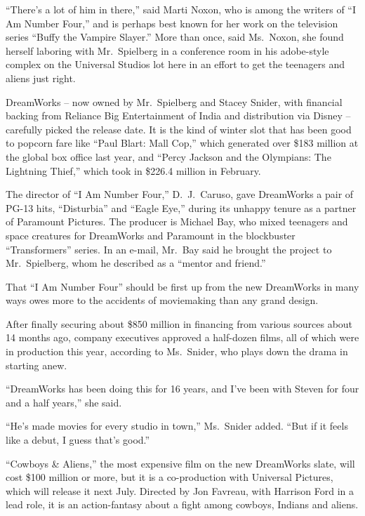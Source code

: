 ﻿\documentclass[12pt]{article}
\begin{document}
``There's a lot of him in there,'' said Marti Noxon, who is among the writers of ``I Am Number
Four,'' and is perhaps best known for her work on the television series ``Buffy the Vampire
Slayer.'' More than once, said Ms.~Noxon, she found herself laboring with Mr.~Spielberg in a
conference room in his adobe-style complex on the Universal Studios lot here in an effort to get the
teenagers and aliens just right.

DreamWorks -- now owned by Mr.~Spielberg and Stacey Snider, with financial backing from Reliance Big
Entertainment of India and distribution via Disney -- carefully picked the release date. It is the
kind of winter slot that has been good to popcorn fare like ``Paul Blart: Mall Cop,'' which
generated over \$183 million at the global box office last year, and ``Percy Jackson and the
Olympians: The Lightning Thief,'' which took in \$226.4 million in February.

The director of ``I Am Number Four,'' D.~J.~Caruso, gave DreamWorks a pair of PG-13 hits,
``Disturbia'' and ``Eagle Eye,'' during its unhappy tenure as a partner of Paramount Pictures. The
producer is Michael Bay, who mixed teenagers and space creatures for DreamWorks and Paramount in the
blockbuster ``Transformers'' series. In an e-mail, Mr.~Bay said he brought the project to
Mr.~Spielberg, whom he described as a ``mentor and friend.''

That ``I Am Number Four'' should be first up from the new DreamWorks in many ways owes more to the
accidents of moviemaking than any grand design.

After finally securing about \$850 million in financing from various sources about 14 months ago,
company executives approved a half-dozen films, all of which were in production this year, according
to Ms.~Snider, who plays down the drama in starting anew.

``DreamWorks has been doing this for 16 years, and I've been with Steven for four and a half
years,'' she said.

``He's made movies for every studio in town,'' Ms.~Snider added. ``But if it feels like a debut, I
guess that's good.''

``Cowboys \& Aliens,'' the most expensive film on the new DreamWorks slate, will cost \$100 million
or more, but it is a co-production with Universal Pictures, which will release it next July.
Directed by Jon Favreau, with Harrison Ford in a lead role, it is an action-fantasy about a fight
among cowboys, Indians and aliens.
\end{document}
